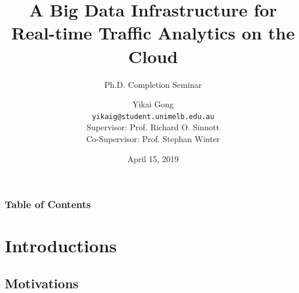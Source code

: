 


\title[Ph.D. Completion Seminar]{A Big Data Infrastructure for Real-time Traffic Analytics on the Cloud}
\subtitle[]{Ph.D. Completion Seminar}
\author[Yikai Gong \hspace{0.1\textwidth} \insertframenumber\,/\,\inserttotalframenumber]{ Yikai Gong \\ \texttt{yikaig@student.unimelb.edu.au}
\\ \vspace{10pt} \small{Supervisor: Prof. Richard O. Sinnott \\Co-Supervisor: Prof. Stephan Winter}
}
\date{April 15, 2019}


\begin{frame}[plain]
    \maketitle
\end{frame}

\begin{frame}[plain]
    \frametitle{Table of Contents}
    \tableofcontents[]
\end{frame}

\section{Introductions}

\subsection{Motivations}

